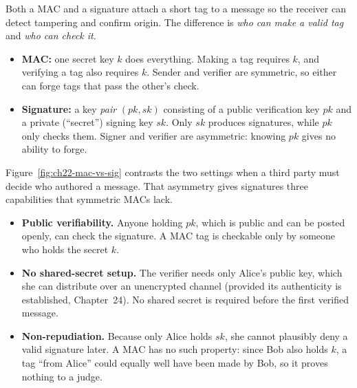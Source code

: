 Both a MAC and a signature attach a short tag to a message so the receiver can detect tampering and confirm origin. The difference is \emph{who can make a valid tag} and \emph{who can check it}.

\begin{itemize}
  \item \textbf{MAC:} one secret key $k$ does everything. Making a tag requires $k$, and verifying a tag also requires $k$. Sender and verifier are symmetric, so either can forge tags that pass the other's check.
  \item \textbf{Signature:} a key \emph{pair} $(pk, sk)$ consisting of a public verification key $pk$ and a private (``secret'') signing key $sk$. Only $sk$ produces signatures, while $pk$ only checks them. Signer and verifier are asymmetric: knowing $pk$ gives no ability to forge.
\end{itemize}

Figure~\ref{fig:ch22-mac-vs-sig} contrasts the two settings when a third party must decide who authored a message. That asymmetry gives signatures three capabilities that symmetric MACs lack.

\begin{itemize}
  \item \textbf{Public verifiability.} Anyone holding $pk$, which is public and can be posted openly, can check the signature. A MAC tag is checkable only by someone who holds the secret $k$.
  \item \textbf{No shared-secret setup.} The verifier needs only Alice's public key, which she can distribute over an unencrypted channel (provided its authenticity is established, Chapter~24). No shared secret is required before the first verified message.
  \item \textbf{Non-repudiation.} Because only Alice holds $sk$, she cannot plausibly deny a valid signature later. A MAC has no such property: since Bob also holds $k$, a tag ``from Alice'' could equally well have been made by Bob, so it proves nothing to a judge.
\end{itemize}

